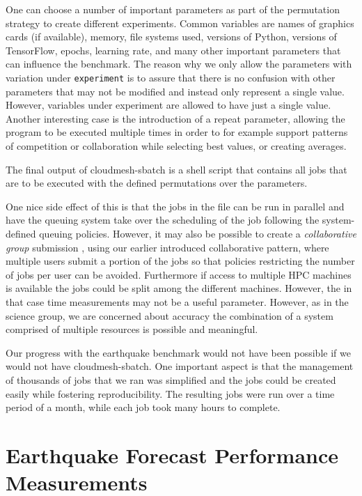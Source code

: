 \documentclass[utf8]{FrontiersinVancouver} %
\begin{document}
One can choose a number of important parameters as part of the
permutation strategy to create different experiments. Common variables
are names of graphics cards (if available), memory, file systems used,
versions of Python, versions of TensorFlow, epochs, learning rate, and
many other important parameters that can influence the benchmark.  The
reason why we only allow the parameters with variation under
\verb|experiment| is to assure that there is no confusion with other
parameters that may not be modified and instead only represent a
single value. However, variables under experiment are allowed to have
just a single value.  Another interesting case is the introduction of
a repeat parameter, allowing the program to be executed multiple times
in order to for example support patterns of competition or
collaboration while selecting best values, or creating averages.


The final output of cloudmesh-sbatch is a shell script that contains
all jobs that are to be executed with the defined permutations over the
parameters.

One nice side effect of this is that the jobs in the file can be run
in parallel and have the queuing system take over the scheduling of
the job following the system-defined queuing policies. However, it may
also be possible to create a {\it collaborative group} submission ,
using our earlier introduced collaborative pattern, where multiple
users submit a portion of the jobs so that policies restricting the
number of jobs per user can be avoided. Furthermore if access to
multiple HPC machines is available the jobs could be split among the
different machines. However, the in that case time measurements may
not be a useful parameter. However, as in the science group, we are
concerned about accuracy the combination of a system comprised of
multiple resources is possible and meaningful.

Our progress with the earthquake benchmark would not have been
possible if we would not have cloudmesh-sbatch. One important aspect
is that the management of thousands of jobs that we ran was simplified
and the jobs could be created easily while fostering
reproducibility. The resulting jobs were run over a time period of a
month, while each job took many hours to complete.





\section{Earthquake Forecast Performance Measurements}
\label{sec:perf-main}
\end{document}
